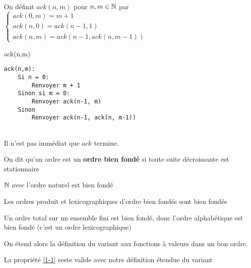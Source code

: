 \begin{example} \enspace \\
	\begin{minipage}{0.4\linewidth}
		On définit $ack(n,m)$ pour $n,m\in \mathbb{N}$ par \\ $\left\{\begin{array}{l}
			ack(0,m) = m+1\\
			ack(n, 0) = ack(n-1, 1)\\
			ack(n,m) = ack(n-1, ack(n, m-1))
		\end{array}\right.$
	\end{minipage}\quad
	\begin{minipage}{0.55\linewidth}
		\begin{algorithm}[H]
			\caption{ack(n,m)}
		\end{algorithm}
		\begin{lstlisting}
ack(n,m):
    Si n = 0:
        Renvoyer m + 1
    Sinon si m = 0:
        Renvoyer ack(n-1, m)
    Sinon
        Renvoyer ack(n-1, ack(n, m-1))
		\end{lstlisting}
	\end{minipage} \\Il n'est pas immédiat que $ack$ termine.
\end{example}

\begin{definition}
	On dit qu'un ordre est un \textbf{ordre bien fondé} si toute suite décroissante est stationnaire
\end{definition}

\begin{example}
	$\mathbb{N}$ avec l'ordre naturel est bien fondé 
\end{example}

\begin{proposition}
	Les ordres produit et lexicographiques d'ordre bien fondés sont bien fondés
\end{proposition}

\begin{example}
	Un ordre total sur un ensemble fini est bien fondé, donc l'ordre alphabétique est bien fondé (c'est un ordre lexicographique)
\end{example}

\begin{definition}
	On étend alors la définition du variant aux fonctions à valeurs dans un bon ordre.
\end{definition}

\begin{proposition}
	La propriété \ref{1-1} reste valide avec notre définition étendue du variant
\end{proposition}

